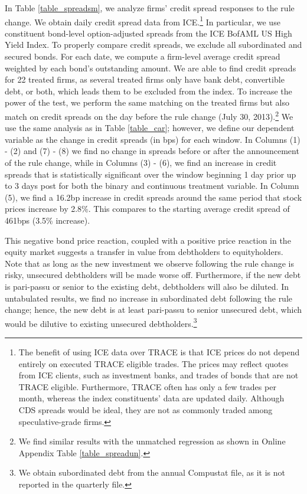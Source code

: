 \documentclass[a4paper, 12pt]{article}
\begin{document}
In Table \ref{table_spreadsm}, we analyze firms' credit spread responses to the rule change. We obtain daily credit spread data from ICE.\footnote{The benefit of using ICE data over TRACE is that ICE prices do not depend entirely on executed TRACE eligible trades. The prices may reflect quotes from ICE clients, such as investment banks, and trades of bonds that are not TRACE eligible. Furthermore, TRACE often has only a few trades per month, whereas the index constituents' data are updated daily. Although CDS spreads would be ideal, they are not as commonly traded among speculative-grade firms.} In particular, we use constituent bond-level option-adjusted spreads from the ICE BofAML US High Yield Index. To properly compare credit spreads, we exclude all subordinated and secured bonds. For each date, we compute a firm-level average credit spread weighted by each bond's outstanding amount. We are able to find credit spreads for 22 treated firms, as several treated firms only have bank debt, convertible debt, or both, which leads them to be excluded from the index. To increase the power of the test, we perform the same matching on the treated firms but also match on credit spreads on the day before the rule change (July 30, 2013).\footnote{We find similar results with the unmatched regression as shown in Online Appendix Table \ref{table_spreadun}.} We use the same analysis as in Table \ref{table_car}; however, we define our dependent variable as the change in credit spreads (in bps) for each window. In Columns (1) - (2) and (7) - (8) we find no change in spreads before or after the announcement of the rule change, while in Columns (3) - (6), we find an increase in credit spreads that is statistically significant over the window beginning 1 day prior up to 3 days post for both the binary and continuous treatment variable. In Column (5), we find a 16.2bp increase in credit spreads around the same period that stock prices increase by 2.8\%. This compares to the starting average credit spread of 461bps (3.5\% increase).

This negative bond price reaction, coupled with a positive price reaction in the equity market suggests a transfer in value from debtholders to equityholders. Note that as long as the new investment we observe following the rule change is risky, unsecured debtholders will be made worse off. Furthermore, if the new debt is pari-passu or senior to the existing debt, debtholders will also be diluted. In untabulated results, we find no increase in subordinated debt following the rule change; hence, the new debt is at least pari-passu to senior unsecured debt, which would be dilutive to existing unsecured debtholders.\footnote{We obtain subordinated debt from the annual Compustat file, as it is not reported in the quarterly file.}
\end{document}
